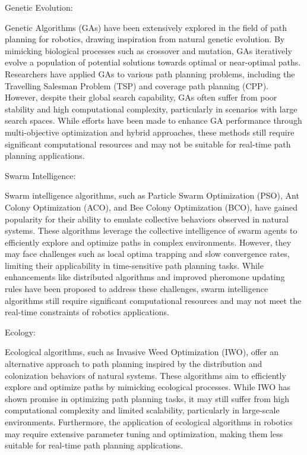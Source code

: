 \vspace*{6mm}




Genetic Evolution:

Genetic Algorithms (GAs) have been extensively explored in the field of path planning for robotics, drawing inspiration from natural genetic evolution. By mimicking biological processes such as crossover and mutation, GAs iteratively evolve a population of potential solutions towards optimal or near-optimal paths. Researchers have applied GAs to various path planning problems, including the Travelling Salesman Problem (TSP) and coverage path planning (CPP). However, despite their global search capability, GAs often suffer from poor stability and high computational complexity, particularly in scenarios with large search spaces. While efforts have been made to enhance GA performance through multi-objective optimization and hybrid approaches, these methods still require significant computational resources and may not be suitable for real-time path planning applications.

\vspace*{6mm}


Swarm Intelligence:

Swarm intelligence algorithms, such as Particle Swarm Optimization (PSO), Ant Colony Optimization (ACO), and Bee Colony Optimization (BCO), have gained popularity for their ability to emulate collective behaviors observed in natural systems. These algorithms leverage the collective intelligence of swarm agents to efficiently explore and optimize paths in complex environments. However, they may face challenges such as local optima trapping and slow convergence rates, limiting their applicability in time-sensitive path planning tasks. While enhancements like distributed algorithms and improved pheromone updating rules have been proposed to address these challenges, swarm intelligence algorithms still require significant computational resources and may not meet the real-time constraints of robotics applications.

\vspace*{6mm}


Ecology:

Ecological algorithms, such as Invasive Weed Optimization (IWO), offer an alternative approach to path planning inspired by the distribution and colonization behaviors of natural systems. These algorithms aim to efficiently explore and optimize paths by mimicking ecological processes. While IWO has shown promise in optimizing path planning tasks, it may still suffer from high computational complexity and limited scalability, particularly in large-scale environments. Furthermore, the application of ecological algorithms in robotics may require extensive parameter tuning and optimization, making them less suitable for real-time path planning applications.

